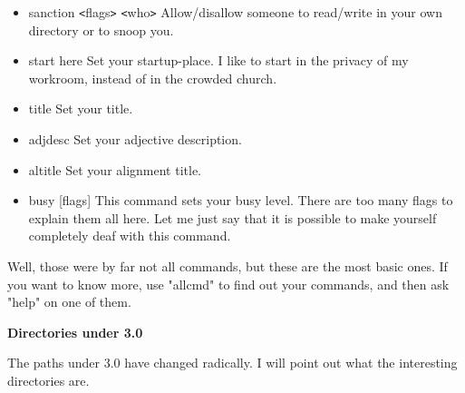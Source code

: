 \begin{itemize}
\item sanction \verb+<+flags\verb+>+ \verb+<+who\verb+>+ Allow/disallow someone
                to read/write in your
                   own directory or to snoop you.

\item start here      Set your startup-place. I like to start in the privacy
                   of my workroom, instead of in the crowded church.

\item title           Set your title.

\item adjdesc         Set your adjective description.

\item altitle         Set your alignment title.

\item busy [flags]    This command sets your busy level. There are too many
                   flags to explain them all here. Let me just say that
                   it is possible to make yourself completely deaf with
                   this command.
\end{itemize}

Well, those were by far not all commands, but these are the most basic ones.
If you want to know more, use "allcmd" to find out your commands, and then
ask "help" on one of them.

{\bf Directories under 3.0}

The paths under 3.0 have changed radically. I will point out what the
interesting directories are.

